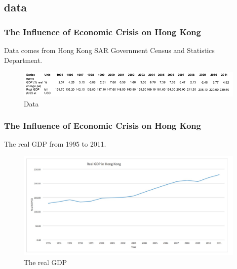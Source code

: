 \documentclass[slidestop,uncompress,mathsans, 12pt]{beamer}
\begin{document}
\subsection{data}
\begin{frame}
\frametitle{The Influence of Economic Crisis on Hong Kong }
Data comes from Hong Kong SAR Government Census and Statistics Department.\\
\bigskip
\begin{figure}[h]
\raggedleft
\includegraphics[width=1\textwidth]{hk1.png}
\caption{Data}
\label{threadsVsSync}
\end{figure}
\end{frame}

\begin{frame}
\frametitle{The Influence of Economic Crisis on Hong Kong }
The real GDP from 1995 to 2011.
\bigskip
\begin{figure}[h]
\raggedleft
\includegraphics[width=1\textwidth]{hk2.jpg}
\caption{The real GDP}
\label{threadsVsSync}
\end{figure}
\end{frame}
\end{document}
